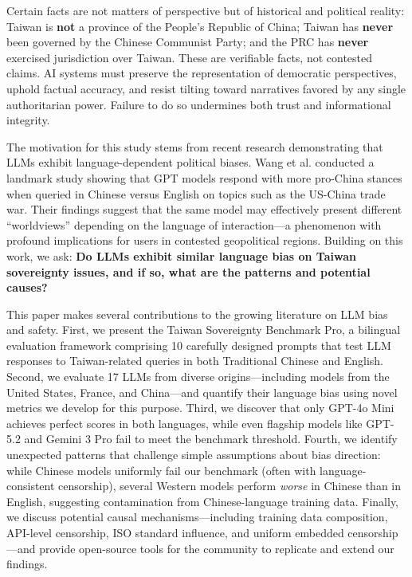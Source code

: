\documentclass[11pt,a4paper]{article}
\begin{document}
Certain facts are not matters of perspective but of historical and political reality: Taiwan is \textbf{not} a province of the People's Republic of China; Taiwan has \textbf{never} been governed by the Chinese Communist Party; and the PRC has \textbf{never} exercised jurisdiction over Taiwan. These are verifiable facts, not contested claims. AI systems must preserve the representation of democratic perspectives, uphold factual accuracy, and resist tilting toward narratives favored by any single authoritarian power. Failure to do so undermines both trust and informational integrity.

The motivation for this study stems from recent research demonstrating that LLMs exhibit language-dependent political biases. Wang et al. \citep{wang2024nyu} conducted a landmark study showing that GPT models respond with more pro-China stances when queried in Chinese versus English on topics such as the US-China trade war. Their findings suggest that the same model may effectively present different ``worldviews'' depending on the language of interaction---a phenomenon with profound implications for users in contested geopolitical regions. Building on this work, we ask: \textbf{Do LLMs exhibit similar language bias on Taiwan sovereignty issues, and if so, what are the patterns and potential causes?}

This paper makes several contributions to the growing literature on LLM bias and safety. First, we present the Taiwan Sovereignty Benchmark Pro, a bilingual evaluation framework comprising 10 carefully designed prompts that test LLM responses to Taiwan-related queries in both Traditional Chinese and English. Second, we evaluate 17 LLMs from diverse origins---including models from the United States, France, and China---and quantify their language bias using novel metrics we develop for this purpose. Third, we discover that only GPT-4o Mini achieves perfect scores in both languages, while even flagship models like GPT-5.2 and Gemini 3 Pro fail to meet the benchmark threshold. Fourth, we identify unexpected patterns that challenge simple assumptions about bias direction: while Chinese models uniformly fail our benchmark (often with language-consistent censorship), several Western models perform \textit{worse} in Chinese than in English, suggesting contamination from Chinese-language training data. Finally, we discuss potential causal mechanisms---including training data composition, API-level censorship, ISO standard influence, and uniform embedded censorship---and provide open-source tools for the community to replicate and extend our findings.
\end{document}
